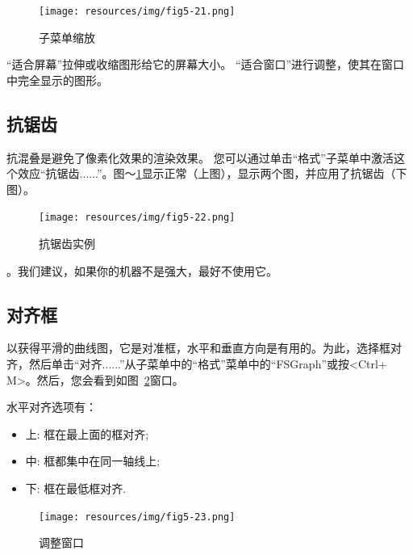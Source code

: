 \bigskip
\begin{figure}[h]
\begin{center}
\texttt{[image: resources/img/fig5-21.png]}
\caption{子菜单缩放}
\end{center}
\end{figure}

\noindent “适合屏幕”拉伸或收缩图形给它的屏幕大小。 “适合窗口”进行调整，使其在窗口中完全显示的图形。

\subsection{抗锯齿}
抗混叠是避免了像素化效果的渲染效果。
您可以通过单击“格式”子菜单中激活这个效应“抗锯齿......”。图〜\ref{fig-antialiasing}显示正常（上图），显示两个图，并应用了抗锯齿（下图）。


\bigskip
\begin{figure}[!ht]
\begin{center}
\texttt{[image: resources/img/fig5-22.png]}
\caption{抗锯齿实例\label{fig-antialiasing}}
\end{center}
\end{figure}

。我们建议，如果你的机器不是强大，最好不使用它。



\subsection{对齐框}
以获得平滑的曲线图，它是对准框，水平和垂直方向是有用的。为此，选择框对齐，然后单击“对齐......”从子菜单中的“格式”菜单中的“FSGraph”或按<Ctrl+ M>。然后，您会看到如图~\ref{fig-alignment-frame}窗口。

\bigskip
\noindent 水平对齐选项有：
\begin{itemize}
  \item 上: 框在最上面的框对齐;
  \item 中: 框都集中在同一轴线上;
  \item 下: 框在最低框对齐.
\end{itemize}

\begin{figure}[!h]
\begin{center}
\texttt{[image: resources/img/fig5-23.png]}
\caption{调整窗口\label{fig-alignment-frame}}
\end{center}
\end{figure}

